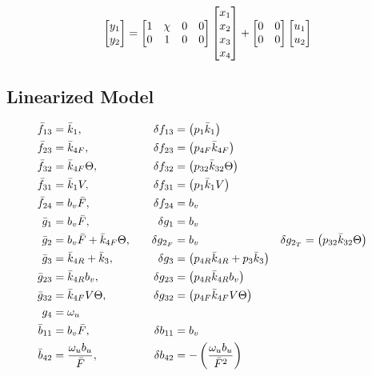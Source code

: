 \begin{equation}\label{eqn::ctrl_out}
    \begin{bmatrix} y_1 \\ y_2 \end{bmatrix} = \begin{bmatrix} 1 & \chi & 0 & 0 \\
                                 0 & 1       & 0 & 0 \end{bmatrix}
                            \begin{bmatrix} x_1 \\ x_2 \\ x_3 \\ x_4 \end{bmatrix} +
                            \begin{bmatrix} 0 & 0 \\
                                0 & 0 \\ \end{bmatrix}
                            \begin{bmatrix} u_1 \\ u_2 \end{bmatrix}
\end{equation}


\subsection{Linearized Model \label{eqn::lin_model}}
\begin{align*}
     \bar f_{13} &= \bar k_{1}, \quad&
    \delta f_{13} &= \left(  p_{1} \bar k_{1}  \right) \\
     \bar f_{23} &= \bar k_{4F}, \quad &
    \delta f_{23}  &= \left(  p_{4F} \bar k_{4F}  \right) \\
     \bar f_{32} &= \bar k_{4F} \Theta, \quad &
    \delta f_{32}  &= \left(  p_{32}  \bar k_{32} \Theta  \right)
    \\
     \bar f_{31} &= \bar k_1 V, \quad &
    \delta f_{31}  &= \left(  p_1 \bar k_1 V  \right)
    \\
     \bar f_{24} &= b_v \bar F,
    \quad &
    \delta f_{24}  &= b_v
    \\
     \bar g_1 &= b_v \bar F,
    \quad &
    \delta g_1  &= b_v
    \\
    \bar g_2 &= b_v \bar F + \bar k_{4F} \Theta,
    \quad &
    \delta g_{2_F}  &= b_v
    \quad &
    \delta g_{2_T} &= \left(  p_{32}  \bar k_{32}  \Theta  \right)
    \\
    \bar g_3 &= \bar k_{4R} + \bar k_3,
    \quad &
    \delta g_3 &= \left(  p_{4R} \bar k_{4R} + p_3 \bar k_3 \right)
    \\
    \bar g_{23} &= \bar k_{4R} b_v,
    \quad &
    \delta g_{23}  &= \left(  p_{4R} \bar k_{4R} b_v  \right)
    \\
    \bar g_{32} &= \bar k_{4F} V \Theta,
    \quad &
    \delta g_{32}  &= \left(  p_{4F} \bar k_{4F} V \Theta  \right)
    \\
    g_4 &= \omega_u
    \\
    \bar b_{11} &= b_v \bar F,
    \quad &
    \delta b_{11} &= b_v
    \\
    \bar b_{42} &= \frac{\omega_u b_u}{\bar F},
    \quad &
    \delta b_{42}  &= -\left( \frac{\omega_u b_u}{\bar F^2} \right)
\end{align*}


